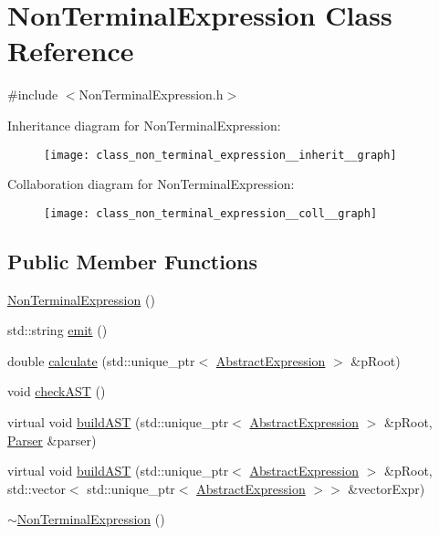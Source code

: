 \hypertarget{class_non_terminal_expression}{}\section{Non\+Terminal\+Expression Class Reference}
\label{class_non_terminal_expression}


{\ttfamily \#include $<$Non\+Terminal\+Expression.\+h$>$}



Inheritance diagram for Non\+Terminal\+Expression\+:
\nopagebreak
\begin{figure}[H]
\begin{center}
\leavevmode
\texttt{[image: class\_non\_terminal\_expression\_\_inherit\_\_graph]}
\end{center}
\end{figure}


Collaboration diagram for Non\+Terminal\+Expression\+:
\nopagebreak
\begin{figure}[H]
\begin{center}
\leavevmode
\texttt{[image: class\_non\_terminal\_expression\_\_coll\_\_graph]}
\end{center}
\end{figure}
\subsection*{Public Member Functions}
\begin{DoxyCompactItemize}
\item 
\mbox{\hyperlink{class_non_terminal_expression_aa530691d17ddd813ee59f3d78319e9d5}{Non\+Terminal\+Expression}} ()
\item 
std\+::string \mbox{\hyperlink{class_non_terminal_expression_affcc5d6e649552b3788661ec9663eb63}{emit}} ()
\item 
double \mbox{\hyperlink{class_non_terminal_expression_a41f5031f53384915aef5c19a88671afe}{calculate}} (std\+::unique\+\_\+ptr$<$ \mbox{\hyperlink{class_abstract_expression}{Abstract\+Expression}} $>$ \&p\+Root)
\item 
void \mbox{\hyperlink{class_non_terminal_expression_a04d61bbfb066afe1c603396e9e69c397}{check\+A\+ST}} ()
\item 
virtual void \mbox{\hyperlink{class_non_terminal_expression_aa65153b69523e01d86893f6d7b7fc480}{build\+A\+ST}} (std\+::unique\+\_\+ptr$<$ \mbox{\hyperlink{class_abstract_expression}{Abstract\+Expression}} $>$ \&p\+Root, \mbox{\hyperlink{class_parser}{Parser}} \&parser)
\item 
virtual void \mbox{\hyperlink{class_non_terminal_expression_a2bdcc38fdd63ba025df8bac517f7b8e8}{build\+A\+ST}} (std\+::unique\+\_\+ptr$<$ \mbox{\hyperlink{class_abstract_expression}{Abstract\+Expression}} $>$ \&p\+Root, std\+::vector$<$ std\+::unique\+\_\+ptr$<$ \mbox{\hyperlink{class_abstract_expression}{Abstract\+Expression}} $>$$>$ \&vector\+Expr)
\item 
\mbox{\hyperlink{class_non_terminal_expression_a76840fcc179491c37ee4c7bf76d36557}{$\sim$\+Non\+Terminal\+Expression}} ()
\end{DoxyCompactItemize}
